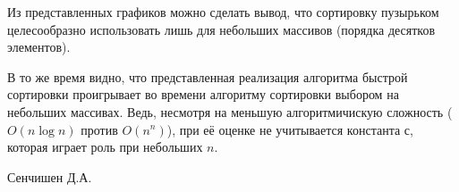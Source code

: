 \documentclass[
	12pt,
	paper=A4,
	oneside,
	draft
]{scrreprt}
\begin{document}
Из представленных графиков можно сделать вывод, что сортировку пузырьком целесообразно использовать лишь для небольших массивов (порядка десятков элементов). 

В то же время видно, что представленная реализация алгоритма быстрой сортировки проигрывает во времени алгоритму сортировки выбором на небольших массивах. Ведь, несмотря на меньшую алгоритмичискую сложность ($O(n\log n)$ против $O(n^n)$), при её оценке не учитывается константа $с$, которая играет роль при небольших $n$.
\vfill
\begin{flushright}
Сенчишен Д.А.
\end{flushright}
\end{document}
